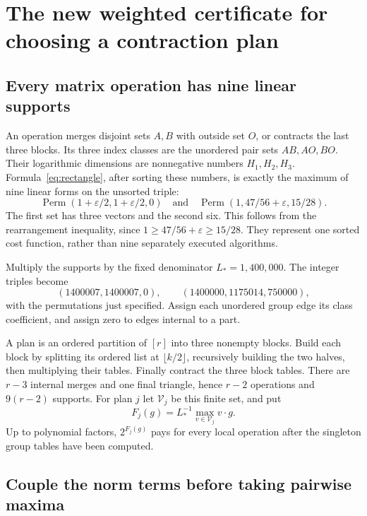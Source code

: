 \section{The new weighted certificate for choosing a contraction plan}
\label{sec:portfolio}

\subsection{Every matrix operation has nine linear supports}

An operation merges disjoint sets $A,B$ with outside set $O$, or contracts
the last three blocks. Its three index classes are the unordered pair sets
$AB,AO,BO$. Their logarithmic dimensions are nonnegative numbers
$H_1,H_2,H_3$. Formula~\eqref{eq:rectangle}, after sorting these numbers,
is exactly the maximum of nine linear forms on the unsorted triple:
\[
 \operatorname{Perm}(1+\varepsilon/2,1+\varepsilon/2,0)
 \quad\text{and}\quad
 \operatorname{Perm}(1,47/56+\varepsilon,15/28).
\]
The first set has three vectors and the second six. This follows from the
rearrangement inequality, since $1\ge47/56+\varepsilon\ge15/28$.
They represent one sorted cost function, rather than nine separately
executed algorithms.

Multiply the supports by the fixed denominator $L_*=1{,}400{,}000$.
The integer triples become
\begin{equation}\label{eq:integer-triples}
 (1400007,1400007,0),\qquad(1400000,1175014,750000),
\end{equation}
with the permutations just specified. Assign each unordered group edge its
class coefficient, and assign zero to edges internal to a part.

A plan is an ordered partition of $[r]$ into three nonempty blocks. Build
each block by splitting its ordered list at $\lfloor k/2\rfloor$,
recursively building the two halves, then multiplying their tables.
Finally contract the three block tables. There are $r-3$ internal merges
and one final triangle, hence $r-2$ operations and $9(r-2)$ supports.
For plan $j$ let $\mathcal V_j$ be this finite set, and put
\[
 F_j(g)=L_*^{-1}\max_{v\in\mathcal V_j}v\cdot g.
\]
Up to polynomial factors, $2^{F_j(g)}$ pays for every local operation
after the singleton group tables have been computed.

\subsection{Couple the norm terms before taking pairwise maxima}

